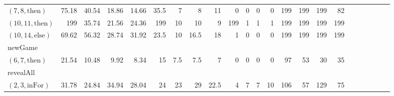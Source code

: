 \documentclass[sigconf]{acmart}
\newcommand{\thenBr}{\text{then}}
\newcommand{\elseBr}{\text{else}}
\newcommand{\inFor}{\text{inFor}}
\begin{document}
\begin{table*}
{\begin{tabular}{l|rrrr|rrrr|rrrr|rrrr|r|r|r|r|r|r}
    $(7,8,\thenBr)$   & 75.18       & 40.54       & 18.86          & 14.66         & 35.5  & 7     & 8       & 11      & 0        & 0        & 0          & 0           & 199      & 199     & 199        & 82  & & & & & & \\
    $(10,11,\thenBr)$ & 199         & 35.74       & 21.56          & 24.36         & 199   & 10    & 10      & 9       & 199      & 1        & 1          & 1           & 199      & 199     & 199        & 199 & & & & & & \\
    $(10,14,\elseBr)$ & 69.62       & 56.32       & 28.74          & 31.92         & 23.5  & 10    & 16.5    & 18      & 1        & 0        & 0          & 0           & 199      & 199     & 199        & 199 & & & & & & \\
    \midrule
    newGame           &             &             &                &               &       &       &         &         &          &          &            &             &          &         &            & & & & & & & \\
    $(6,7,\thenBr)$   & 21.54       & 10.48       & 9.92           & 8.34          & 15    & 7.5   & 7.5     & 7       & 0        & 0        & 0          & 0           & 97       & 53      & 30         & 35 & & & & & & \\
    \midrule
    revealAll         &             &             &                &               &       &       &         &         &          &          &            &             &          &         &            & \\
    $(2,3,\inFor)$    & 31.78       & 24.84       & 34.94          & 28.04         & 24    & 23    & 29      & 22.5    & 4        & 7        & 7          & 10          & 106      & 57      & 129        & 75 & & & & & & \\

\end{tabular}}
\end{table*}
\end{document}
